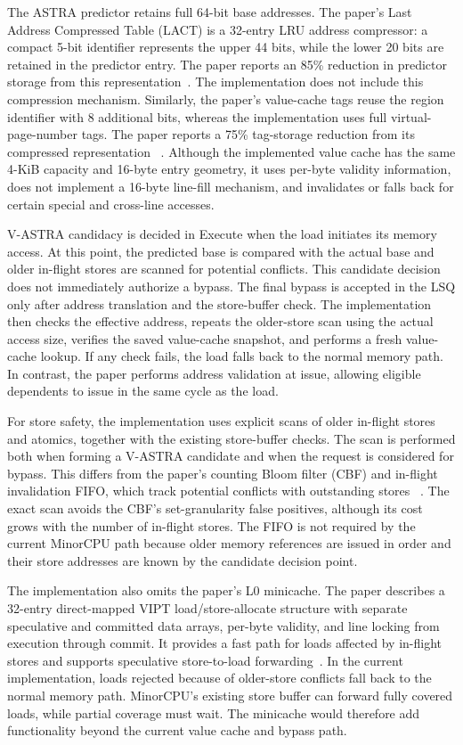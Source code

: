 The ASTRA predictor retains full 64-bit base addresses. The paper's
Last Address Compressed Table (LACT) is a 32-entry LRU address
compressor: a compact 5-bit identifier represents the upper 44 bits,
while the lower 20 bits are retained in the predictor entry. The
paper reports an 85\% reduction in predictor storage from this
representation~\cite{ravenel2025architecting}. The implementation
does not include this compression mechanism. Similarly, the paper's value-cache tags reuse the region
identifier with 8 additional bits, whereas the implementation uses
full virtual-page-number tags. The paper reports a 75\% tag-storage
reduction from its compressed representation
~\cite{ravenel2025architecting}. Although the implemented value cache has the same 4-KiB capacity and 16-byte entry
geometry, it uses per-byte validity information, does not implement a
16-byte line-fill mechanism, and invalidates or falls back for certain
special and cross-line accesses.

V-ASTRA candidacy is decided in Execute when the load initiates its
memory access. At this point, the predicted base is compared with the
actual base and older in-flight stores are scanned for potential
conflicts. This candidate decision does not immediately authorize a
bypass. The final bypass is accepted in the LSQ only after
address translation and the store-buffer check. The implementation
then checks the effective address, repeats the older-store scan using
the actual access size, verifies the saved value-cache snapshot, and
performs a fresh value-cache lookup. If any check fails, the load falls
back to the normal memory path. In contrast, the paper performs
address validation at issue, allowing eligible dependents to issue in
the same cycle as the load.

For store safety, the implementation uses explicit scans of older
in-flight stores and atomics, together with the existing store-buffer
checks. The scan is performed both when forming a V-ASTRA candidate
and when the request is considered for bypass. This differs from the
paper's counting Bloom filter (CBF) and in-flight invalidation FIFO,
which track potential conflicts with outstanding stores
~\cite{ravenel2025architecting}. The exact
scan avoids the CBF's set-granularity false positives, although its
cost grows with the number of in-flight stores. The FIFO is not
required by the current MinorCPU path because older memory references
are issued in order and their store addresses are known by the
candidate decision point.

The implementation also omits the paper's L0 minicache. The paper
describes a 32-entry direct-mapped VIPT load/store-allocate structure
with separate speculative and committed data arrays, per-byte
validity, and line locking from execution through commit. It provides
a fast path for loads affected by in-flight stores and supports
speculative store-to-load forwarding~\cite{ravenel2025architecting}. In the
current implementation, loads rejected because of older-store conflicts fall back to the
normal memory path. MinorCPU's existing store buffer can forward fully
covered loads, while partial coverage must wait. The minicache would
therefore add functionality beyond the current value cache and bypass
path.

